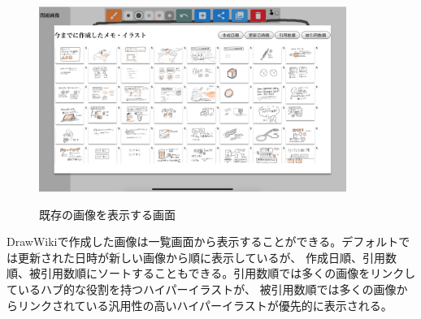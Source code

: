 \begin{figure}[htbp]
    \begin{center}
    {\includegraphics[width=100mm]{images/drawwikiimagelist.png}} \end{center}
    \caption{既存の画像を表示する画面}
    \label{imagelistview}
\end{figure}

DrawWikiで作成した画像は一覧画面から表示することができる。デフォルトでは更新された日時が新しい画像から順に表示しているが、
作成日順、引用数順、被引用数順にソートすることもできる。引用数順では多くの画像をリンクしているハブ的な役割を持つハイパーイラストが、
被引用数順では多くの画像からリンクされている汎用性の高いハイパーイラストが優先的に表示される。